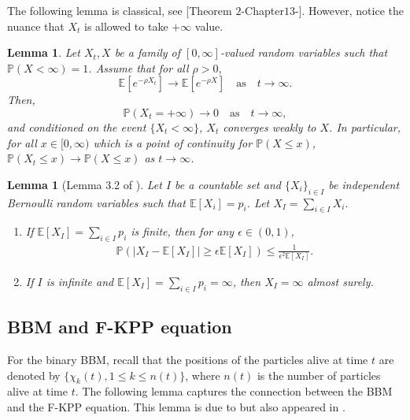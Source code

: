 \documentclass[a4paper,reqno]{amsart}%
\newcommand{\1}{\mathbf 1}
\theoremstyle{mine}
\numberwithin{theorem}{section}
\newtheorem{lemma}[theorem]{Lemma}
\numberwithin{equation}{section}
\theoremstyle{remark}
\begin{document}
The following lemma is classical, see [Theorem $2$-Chapter$13$-\cite{Feller-book-Vol2}]. However, notice the nuance that $X_t$ is allowed to take $+\infty$ value.  

\begin{lemma}\label{Feller's lemma}
    Let $X_t,X$ be a family of $[0,\infty]$-valued random variables such that $\mathbb{P}\left(X <\infty\right) = 1$. Assume that for all $\rho>0$,
    \begin{equation}
        \mathbb{E}[e^{-\rho X_t}] \longrightarrow \mathbb{E}[e^{-\rho X}] \quad \text{as} \quad t\to\infty.
    \end{equation}
    Then, 
    \begin{equation}
        \mathbb{P}\left(X_{t} = +\infty\right) \to 0 \quad \text{as} \quad t\to\infty,
    \end{equation} 
    and conditioned on the event $\{X_{t}<\infty \}$, $X_{t}$ converges weakly to $X$. In particular, for all $x \in [0,\infty)$ which is a point of continuity for  $\mathbb{P}(X\leq x)$, $\mathbb{P}\left(X_{t}\le x\right) \to \mathbb{P}\left(X\le x\right)$ as $t\to\infty$.
\end{lemma}



  
 

\begin{lemma} [Lemma 3.2 of \cite{Shekhar_FP}]\label{Lemma_bernoulli}
Let $I$ be a countable set and $\{X_i\}_{ i\in I }$ be independent Bernoulli random variables such that $\mathbb E[X_i]=p_i$. Let $X_I=\sum_{i \in I}X_i.$ 
\begin{enumerate}[label=(\alph*)]
    \item If $\mathbb E[X_I]=\sum_{i \in I}p_i$ is finite, then for any $\epsilon \in (0,1)$,
\begin{align*}
\mathbb P(|X_I-\mathbb E[X_I]|\ge \epsilon \mathbb E[X_I])\le \frac{1}{\epsilon^2 \mathbb E[X_I]}.
\end{align*}

\item If $I$ is infinite and $\mathbb E[X_I]=\sum_{i \in I} p_i= \infty$, then  $X_I=\infty$ almost surely.
\end{enumerate}

 
\end{lemma}   

\subsection{BBM and F-KPP equation}\label{Section BBM F-KPP} For the binary BBM, recall that the positions of the particles alive at time $t$ are denoted by $\{\chi_k(t), 1 \le k \le n(t)\}$, where $n(t)$ is the number of particles alive at time $t$. The following lemma captures the connection between the BBM and the F-KPP equation. This lemma is due to \cite{McKean} but also appeared in \cite{Skorohod_branching,Ikeda_1,Ikeda_2,Ikeda_3}.
\end{document}
